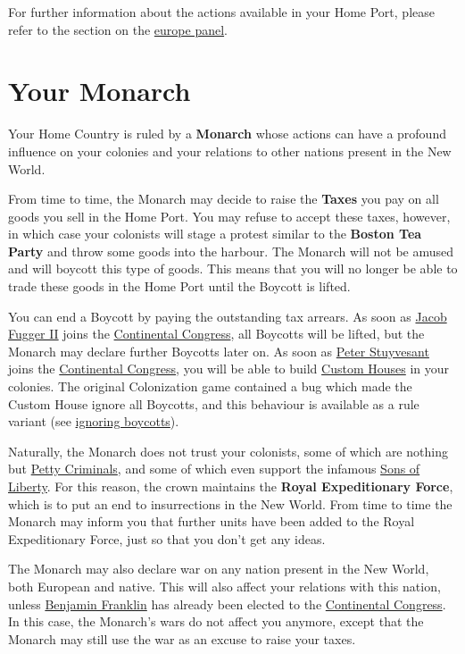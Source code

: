\documentclass[12pt]{book}
\newcommand{\Concept}[1]{\index{#1}\hypertarget{#1}{\textbf{#1}}}
\begin{document}
For further information about the actions available in your Home Port,
please refer to the section on the \hyperlink{europe panel}{europe panel}.


\hypertarget{Monarch}{\section{Your Monarch}}

Your Home Country is ruled by a \textbf{Monarch} whose actions can
have a profound influence on your colonies and your relations to other
nations present in the New World.

From time to time, the Monarch may decide to raise the
\Concept{Taxes} you pay on all goods you sell in the Home
Port. You may refuse to accept these taxes, however, in which case
your colonists will stage a protest similar to the \Concept{Boston Tea
Party} and throw some goods into the harbour. The Monarch will not be
amused and will  \hypertarget{Boycotts}{boycott} this
type of goods. This means that you will no longer be able to trade
these goods in the Home Port until the Boycott is lifted.

You can end a Boycott by paying the outstanding tax arrears. As soon
as \hyperlink{Jacob Fugger II}{Jacob Fugger II} joins the
\hyperlink{Continental Congress}{Continental Congress}, all Boycotts
will be lifted, but the Monarch may declare further Boycotts later
on. As soon as \hyperlink{Peter Stuyvesant}{Peter Stuyvesant} joins
the \hyperlink{Continental Congress}{Continental Congress}, you will
be able to build \hyperlink{Custom House}{Custom Houses} in your
colonies. The original Colonization game contained a bug which made
the Custom House ignore all Boycotts, and this behaviour is available
as a rule variant (see \hyperlink{ignore boycotts}{ignoring boycotts}).

Naturally, the Monarch does not trust your colonists, some of which
are nothing but \hyperlink{Petty Criminal}{Petty Criminals}, and some
of which even support the infamous \hyperlink{Sons of Liberty}{Sons of
Liberty}. For this reason, the crown maintains the
\Concept{Royal Expeditionary Force}, which is to put an end to
insurrections in the New World. From time to time the Monarch may
inform you that further units have been added to the Royal
Expeditionary Force, just so that you don't get any ideas.

The Monarch may also declare war on any nation present in the New
World, both European and native. This will also affect your relations
with this nation, unless \hyperlink{Benjamin Franklin}{Benjamin
Franklin} has already been elected to the \hyperlink{Continental
Congress}{Continental Congress}. In this case, the Monarch's wars do
not affect you anymore, except that the Monarch may still use the war
as an excuse to raise your taxes.
\end{document}
